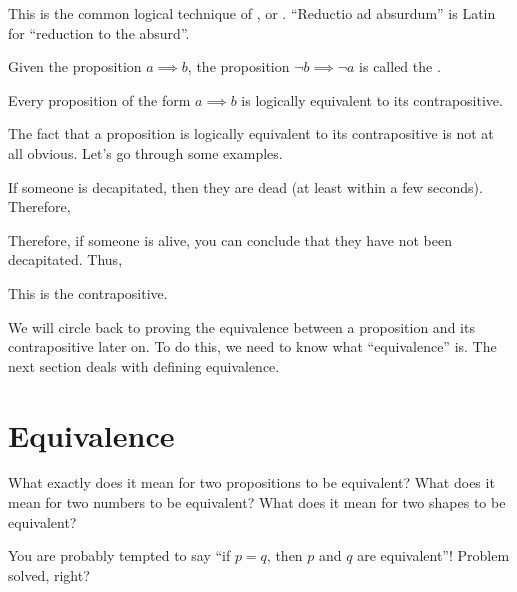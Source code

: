 This is the common logical technique of ,
or . ``Reductio ad absurdum'' is Latin
for ``reduction to the absurd''.

\begin{definition}
  Given the proposition $a \implies b$, the proposition
  $\lnot b \implies \lnot a$ is called the .
\end{definition}

\begin{theorem}
  \label{reductio-ad-absurdum}
  Every proposition of the form $a \implies b$ is logically equivalent
  to its contrapositive.
\end{theorem}

The fact that a proposition is logically equivalent to its
contrapositive is not at all obvious. Let's go through some examples.

\begin{example}
  If someone is decapitated, then they are dead (at least within a few
  seconds). Therefore,

  \begin{zz}
     \implies {}
  \end{zz}


  Therefore, if someone is alive, you can conclude that they have not
  been decapitated. Thus,

  \begin{zz}
     \implies {}
  \end{zz}

  This is the contrapositive.
\end{example}

We will circle back to proving the equivalence between a proposition
and its contrapositive later on. To do this, we need to know what
``equivalence'' is. The next section deals with defining equivalence.

\section{Equivalence}

What exactly does it mean for two propositions to be equivalent? What
does it mean for two numbers to be equivalent? What does it mean for
two shapes to be equivalent?

You are probably tempted to say ``if $p = q$, then $p$ and $q$ are
equivalent''! Problem solved, right?

